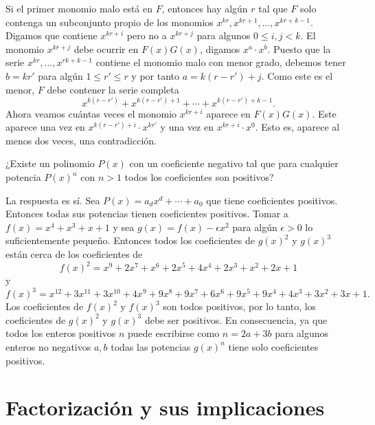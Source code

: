 \begin{solution}
    Si el primer monomio malo está en $F$, entonces hay algún $r$ tal que $F$ solo contenga un subconjunto propio de los monomios $x^{kr}, x^{kr + 1}, \ldots, x^{kr + k - 1}$.
    Digamos que contiene $x^{kr + i}$ pero no a $x^{kr + j}$ para algunos $0 \leq i, j < k$.
    El monomio $x^{kr + j}$ debe ocurrir en $F(x) G(x)$, digamos $x^a \cdot x^b$.
    Puesto que la serie $x^{kr}, \ldots, x^{rk + k - 1}$ contiene el monomio malo con menor grado, debemos tener $b = kr'$ para algún $1 \leq r' \leq r$ y por tanto $a = k(r - r') + j$.
    Como este es el menor, $F$ debe contener la serie completa
    \[
        x^{k(r - r')} + x^{k(r - r') + 1} + \cdots + x^{k(r - r') + k - 1}.
    \]
    Ahora veamos cuántas veces el monomio $x^{kr + i}$ aparece en $F(x) G(x)$.
    Este aparece una vez en $x^{k(r - r') + i} \cdot x^{kr'}$ y una vez en $x^{kr + i}\cdot x^0$.
    Esto es, aparece al menos dos veces, una contradicción.
\end{solution}

\begin{example}
    ¿Existe un polinomio $P(x)$ con un coeficiente negativo tal que para cualquier potencia $P(x)^n$ con $n > 1$ todos los coeficientes son positivos?
\end{example}
\begin{solution}
    La respuesta es sí.
    Sea $P(x) = a_d x^d + \cdots + a_0$ que tiene coeficientes positivos.
    Entonces todas sus potencias tienen coeficientes positivos.
    Tomar a $f(x) = x^4 + x^3 + x + 1$ y sea $g(x) = f(x) - \epsilon x^2$ para algún $\epsilon > 0$ lo suficientemente pequeño.
    Entonces todos los coeficientes de $g(x)^2$ y $g(x)^3$ están cerca de los coeficientes de
    \[
        f(x)^2 = x^9 + 2x^7 + x^6 + 2x^5 + 4x^4 + 2x^3 + x^2 + 2x + 1
    \]
    y
    \[
        f(x)^3 = x^{12} + 3x^{11} + 3x^{10} + 4x^9 + 9x^8 + 9x^7 + 6x^6 + 9x^5 + 9x^4 + 4x^3 + 3x^2 + 3x + 1.
    \]
    Los coeficientes de $f(x)^2$ y $f(x)^3$ son todos positivos, por lo tanto, los coeficientes de $g(x)^2$ y $g(x)^3$ debe ser positivos.
    En consecuencia, ya que todos los enteros positivos $n$ puede escribirse como $n = 2a + 3b$ para algunos enteros no negativos $a, b$ todas las potencias $g(x)^n$ tiene solo coeficientes positivos.
\end{solution}



\section{Factorización y sus implicaciones}

